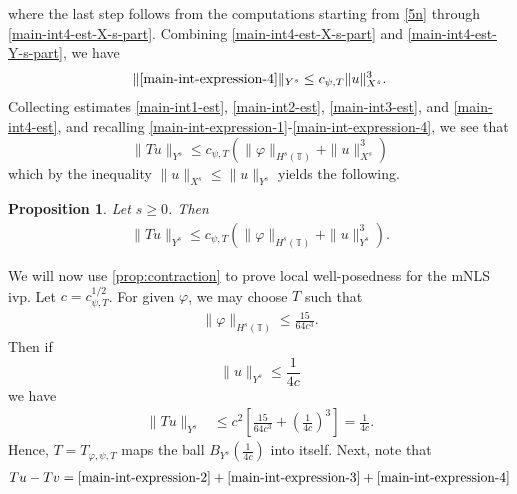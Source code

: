 \documentclass[12pt,reqno]{amsart}
\numberwithin{equation}{section}  %
\numberwithin{figure}{section}
\newcommand{\ci}{\mathbb{T}}
\newcommand{\vp}{\varphi}
\theoremstyle{plain}
\newtheorem{proposition}{Proposition}
\theoremstyle{definition}
\theoremstyle{remark}
\begin{document}
%
%
where the last step follows from the computations starting from \eqref{5n}
through \eqref{main-int4-est-X-s-part}.
Combining \eqref{main-int4-est-X-s-part} and \eqref{main-int4-est-Y-s-part}, we
have
%
%
\begin{equation}
\label{main-int4-est}
	\begin{split}
    \|\eqref{main-int-expression-4}\|_{Y^s} \le c_{\psi, T} \|u\|_{X^s}^{3}.
	\end{split}
\end{equation}
%
%
Collecting estimates \eqref{main-int1-est}, \eqref{main-int2-est}, 
\eqref{main-int3-est}, and \eqref{main-int4-est}, and recalling 
\eqref{main-int-expression-1}-\eqref{main-int-expression-4}, we see that
$$\|Tu\|_{Y^s} \le c_{\psi,T} \left( \|\vp \|_{H^s(\ci)} + \|u\|_{X^s}^3 \right )$$ 
which by the inequality $\|u\|_{X^s} \le \|u\|_{Y^s}$ yields the following.
%
%				 
%
\begin{proposition}
\label{prop:contraction}
	Let $s \ge0$. Then
%
\begin{equation*}
	\begin{split}
		\|Tu\|_{Y^s} \le c_{\psi,T} \left( \|\vp \|_{H^s(\ci)} + \|u\|_{Y^s}^3 
		\right).
	\end{split}
\end{equation*}
%
\end{proposition}
We will now use \autoref{prop:contraction} to prove local well-posedness for the 
mNLS ivp. Let $c = c_{\psi, T}^{1/2}$. For given $\vp$, we may choose $T$ such
that 
%
\begin{equation*}
	\begin{split}
		\|\vp\|_{H^s(\ci)} \le \frac{15}{64c^3}.
	\end{split}
\end{equation*}
%
Then if $$\|u\|_{Y^s} \le \frac{1}{4c}$$ we have
%
\begin{equation*}
	\begin{split}
		\|T u \|_{Y^s} 
		& \le c^2 \left[ \frac{15}{64c^3} + \left( 
		\frac{1}{4c} \right)^3 \right]
		=  \frac{1}{4c}.
	\end{split}
\end{equation*}
%
Hence, $T=T_{\vp, \psi, T}$ maps the ball $B_{Y^{s}}\left( \frac{1}{4c} \right)$ into 
itself. Next, note that
%
\begin{equation*}
	\begin{split}
		Tu - Tv = \eqref{main-int-expression-2} + \eqref{main-int-expression-3} 
		+ \eqref{main-int-expression-4}
	\end{split}
\end{equation*}
\end{document}
